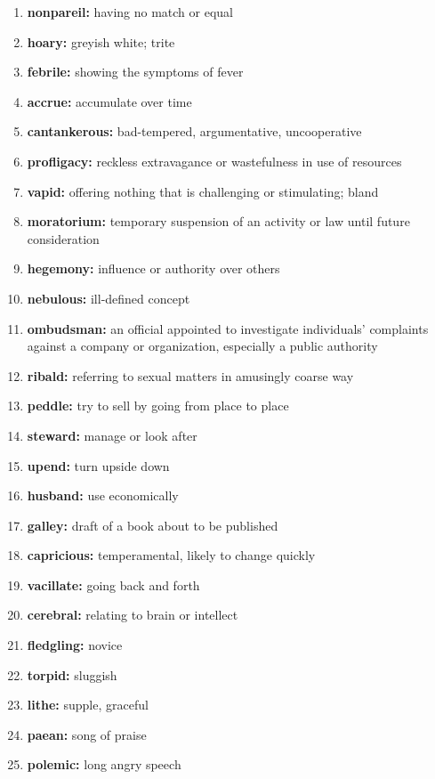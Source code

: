 \documentclass{article}
\begin{document}
\begin{enumerate}
    \item \textbf{nonpareil: }{having no match or equal}
    \item \textbf{hoary: }{greyish white; trite}
    \item \textbf{febrile: }{showing the symptoms of fever}
    \item \textbf{accrue: }{accumulate over time}
    \item \textbf{cantankerous: }{bad-tempered, argumentative, uncooperative}
    \item \textbf{profligacy: }{reckless extravagance or wastefulness in use of resources}
    \item \textbf{vapid: }{offering nothing that is challenging or stimulating; bland}
    \item \textbf{moratorium: }{temporary suspension of an activity or law until future consideration}
    \item \textbf{hegemony: }{influence or authority over others}
    \item \textbf{nebulous: }{ill-defined concept}
    \item \textbf{ombudsman: }{an official appointed to investigate individuals' complaints against a company or organization, especially a public authority}
    \item \textbf{ribald: }{referring to sexual matters in amusingly coarse way}
    \item \textbf{peddle: }{try to sell by going from place to place}
    \item \textbf{steward: }{manage or look after}
    \item \textbf{upend: }{turn upside down}
    \item \textbf{husband: }{use economically}
    \item \textbf{galley: }{draft of a book about to be published}
    \item \textbf{capricious: }{temperamental, likely to change quickly}
    \item \textbf{vacillate: }{going back and forth}
    \item \textbf{cerebral: }{relating to brain or intellect}
    \item \textbf{fledgling: }{novice}
    \item \textbf{torpid: }{sluggish}
    \item \textbf{lithe: }{supple, graceful}
    \item \textbf{paean: }{song of praise}
    \item \textbf{polemic: }{long angry speech}

\end{enumerate}
\end{document}
